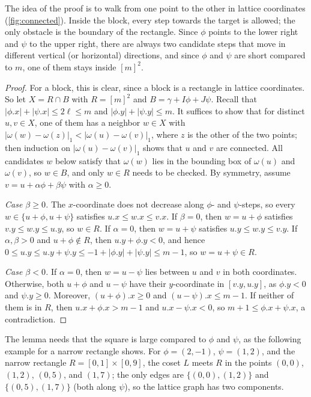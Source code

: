 \documentclass[11pt]{article}
\theoremstyle{definition}
\newcommand{\abs}[1]{\lvert #1 \rvert}
\newcommand{\x}[1]{#1.x}
\newcommand{\y}[1]{#1.y}
\begin{document}
The idea of the proof is to walk from one point to the other in lattice coordinates (\autoref{fig:connected}).
Inside the block, every step towards the target is allowed; the only obstacle is the boundary of the rectangle.
Since $\phi$ points to the lower right and $\psi$ to the upper right, there are always two candidate steps that move in different vertical (or horizontal) directions, and since $\phi$ and $\psi$ are short compared to $m$, one of them stays inside $[m]^2$.
\begin{proof}
For a block, this is clear, since a block is a rectangle in lattice coordinates.
So let $X = R \cap B$ with $R = [m]^2$ and $B = \gamma + I\phi + J\psi$.
Recall that $\abs{\x\phi} + \abs{\x\psi} \le 2\ell \le m$ and $\abs{\y\phi} + \abs{\y\psi} \le m$.
It suffices to show that for distinct $u, v \in X$, one of them has a neighbor $w \in X$ with $\abs{\omega(w) - \omega(z)}_1 < \abs{\omega(u) - \omega(v)}_1$, where $z$ is the other of the two points; then induction on $\abs{\omega(u) - \omega(v)}_1$ shows that $u$ and $v$ are connected.
All candidates $w$ below satisfy that $\omega(w)$ lies in the bounding box of $\omega(u)$ and $\omega(v)$, so $w \in B$, and only $w \in R$ needs to be checked.
By symmetry, assume $v = u + \alpha\phi + \beta\psi$ with $\alpha \ge 0$.

\emph{Case $\beta \ge 0$.} The $x$-coordinate does not decrease along $\phi$- and $\psi$-steps, so every $w \in \{u+\phi, u+\psi\}$ satisfies $\x u \le \x w \le \x v$.
If $\beta = 0$, then $w = u + \phi$ satisfies $\y v \le \y w \le \y u$, so $w \in R$.
If $\alpha = 0$, then $w = u + \psi$ satisfies $\y u \le \y w \le \y v$.
If $\alpha,\beta > 0$ and $u + \phi \notin R$, then $\y u + \y\phi < 0$, and hence $0 \le \y u \le \y u + \y\psi \le -1 + \abs{\y\phi} + \abs{\y\psi} \le m - 1$, so $w = u + \psi \in R$.

\emph{Case $\beta < 0$.} If $\alpha = 0$, then $w = u - \psi$ lies between $u$ and $v$ in both coordinates.
Otherwise, both $u + \phi$ and $u - \psi$ have their $y$-coordinate in $[\y v, \y u]$, as $\y\phi < 0$ and $\y\psi \ge 0$.
Moreover, $\x{(u+\phi)} \ge 0$ and $\x{(u-\psi)} \le m - 1$.
If neither of them is in $R$, then $\x u + \x\phi > m - 1$ and $\x u - \x\psi < 0$, so $m + 1 \le \x\phi + \x\psi$, a contradiction.
\end{proof}

The lemma needs that the square is large compared to $\phi$ and $\psi$, as the following example for a narrow rectangle shows.
For $\phi = (2,-1)$, $\psi = (1,2)$, and the narrow rectangle $R = [0,1] \times [0,9]$, the coset $L$ meets $R$ in the points $(0,0)$, $(1,2)$, $(0,5)$, and $(1,7)$; the only edges are $\{(0,0),(1,2)\}$ and $\{(0,5),(1,7)\}$ (both along $\psi$), so the lattice graph has two components.
\end{document}
